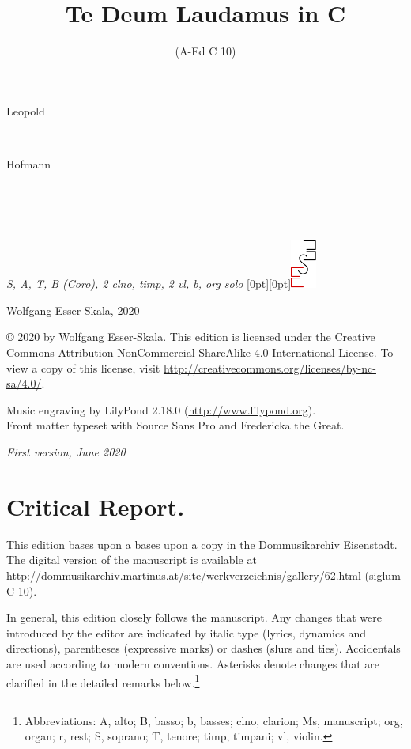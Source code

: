 \documentclass[parskip=full]{scrreprt}
\makeatletter
\DeclareRobustCommand{\sbseries}{\fontseries{sb}\selectfont}
\newcommand\fancytitlehead{
	\headingfont%
	\fontsize{80}{80}\selectfont\textcolor{black!80}{\@lastname.}\\[15pt]%
	\fontsize{60}{60}\selectfont\rlap{\@ifundefined{@shorttitle}{\@title}{\@shorttitle}.}%
}
\def\firstname#1{\def\@firstname{#1}}
\def\lastname#1{\def\@lastname{#1}}
\def\shorttitle#1{\def\@shorttitle{#1}}
\def\instrumentation#1{\def\@instrumentation{#1}}
\def\maketitle{%
\begin{titlepage}%
	\Large%
	{\@titlehead}%
	\vfill%
	{\strut\@firstname}\\%
	{\sbseries\color{oldred}\strut\@lastname}\\%
	{\strut\@namesuffix}%
	\vfill%
	{\sbseries\@title}\\%
	{\@subtitle}\\[\baselineskip]%
	{\itshape\@instrumentation}%
	\vfill%
	{\itshape\@parts}\hspace*{\fill}\raisebox{0pt}[0pt][0pt]{\includegraphics{ees_logo}}%
\end{titlepage}%
}
\newif\ifprintreport\printreportfalse
\makeatother
\begin{document}
\titlehead{\fancytitlehead}
\firstname{Leopold}
\lastname{Hofmann}
\title{Te Deum Laudamus in C}
\shorttitle{Te Deum}
\subtitle{(A-Ed C 10)}
\instrumentation{S, A, T, B (Coro), 2 clno, timp, 2 vl, b, org solo}
\maketitle


\thispagestyle{empty}

\vspace*{\fill}

\hspace*{1em}Wolfgang Esser-Skala, 2020

© 2020 by Wolfgang Esser-Skala. This edition is licensed under the Creative Commons Attribution-NonCommercial-ShareAlike 4.0 International License. To view a copy of this license, visit \url{http://creativecommons.org/licenses/by-nc-sa/4.0/}. 

Music engraving by LilyPond 2.18.0 (\url{http://www.lilypond.org}).\\
Front matter typeset with Source Sans Pro and Fredericka the Great.

\textit{First version, June 2020}

\vspace*{2cm}

\ifprintreport
\chapter*{Critical Report.}

This edition bases upon a bases upon a copy in the Dommusikarchiv Eisenstadt. The digital version of the manuscript is available at \url{http://dommusikarchiv.martinus.at/site/werkverzeichnis/gallery/62.html} (siglum C 10).

In general, this edition closely follows the manuscript. Any changes that were introduced by the editor are indicated by italic type (lyrics, dynamics and directions), parentheses (expressive marks) or dashes (slurs and ties). Accidentals are used according to modern conventions. Asterisks denote changes that are clarified in the detailed remarks below.\footnote{Abbreviations: A, alto; B, basso; b, basses; clno, clarion; Ms, manuscript; org, organ; r, rest; S, soprano; T, tenore; timp, timpani; vl, violin.}
\end{document}
